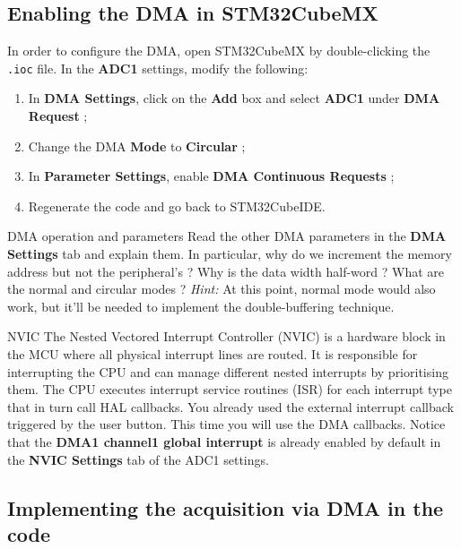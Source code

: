 \subsection{Enabling the DMA in STM32CubeMX}

In order to configure the DMA, open STM32CubeMX by double-clicking the \texttt{.ioc} file. In the \textbf{ADC1} settings, modify the following:
\begin{enumerate}
    \item In \textbf{DMA Settings}, click on the \textbf{Add} box and select \textbf{ADC1} under \textbf{DMA Request} ;
    \item Change the DMA \textbf{Mode} to \textbf{Circular} ;
    \item In \textbf{Parameter Settings}, enable \textbf{DMA Continuous Requests} ;
    \item Regenerate the code and go back to STM32CubeIDE.
\end{enumerate}

\begin{bclogo}[couleur = gray!20, arrondi = 0.2, logo=\bcquestion]{DMA operation and parameters}
Read the other DMA parameters in the \textbf{DMA Settings} tab and explain them. In particular, why do we increment the memory address but not the peripheral's ? Why is the data width half-word ? What are the normal and circular modes ? \textit{Hint:} At this point, normal mode would also work, but it'll be needed to implement the double-buffering technique.
\end{bclogo}

\begin{bclogo}[couleur = gray!20, arrondi = 0.2, logo=\bcinfo]{NVIC}
The Nested Vectored Interrupt Controller (NVIC) is a hardware block in the MCU where all physical interrupt lines are routed. It is responsible for interrupting the CPU and can manage different nested interrupts by prioritising them. The CPU executes interrupt service routines (ISR) for each interrupt type that in turn call HAL callbacks. You already used the external interrupt callback triggered by the user button. This time you will use the DMA callbacks. Notice that the \textbf{DMA1 channel1 global interrupt} is already enabled by default in the \textbf{NVIC Settings} tab of the ADC1 settings.
\end{bclogo}

\subsection{Implementing the acquisition via DMA in the code}

